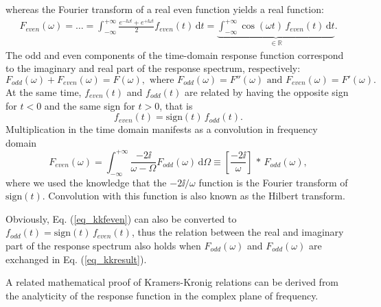 whereas the Fourier transform of a real even function yields a real function:
\begin{equation} 
\begin{split} 
F_{even}(\omega)= \ldots =   \int_{-\infty}^{+\infty} \frac{e^{-\ii \omega t}+e^{+\ii \omega t}}{2} f_{even}(t) \,\mbox{d}t 
		 = \underbrace{\int_{-\infty}^{+\infty} \cos(\omega t) \, f_{even}(t) \,\mbox{d}t}_{\mbox{$\in \mathbb{R}$}}.
\end{split} 
\label{eq_kkFeven}\end{equation}
The odd and even components of the time-domain response function correspond to the imaginary and real part of the response spectrum, respectively:
\begin{equation} F_{odd}(\omega) + F_{even}(\omega) = F(\omega), \text{ where } F_{odd}(\omega) = F''(\omega) \text{ and } F_{even}(\omega) = F'(\omega).  \label{eq_kkFodd}\end{equation}
At the same time, $f_{even}(t)$ and $f_{odd}(t)$ are related by having the opposite sign for $t<0$ and the same sign for $t>0$, that is 
\begin{equation} f_{even}(t) = \mbox{sign}(t)\,f_{odd}(t). \label{eq_kkfeven}\end{equation}
Multiplication in the time domain manifests as a convolution in frequency domain
\begin{equation} 
F_{even}(\omega) = \int_{-\infty}^{+\infty}  \frac{-2\ii}{\omega - \Omega} F_{odd}(\omega) \,\mbox{d}\Omega  \equiv  \left[\frac{-2\ii}{\omega}\right]\,\ast\,F_{odd}(\omega),
\label{eq_kkresult}\end{equation} 
where we used the knowledge that the $-2\ii/\omega$ function is the Fourier transform of $\mbox{sign}(t)$. Convolution with this function is also known as the Hilbert transform.%

Obviously, Eq. (\ref{eq_kkfeven}) can also be converted to $f_{odd}(t) = \mbox{sign}(t)\,f_{even}(t)$, thus the relation between the real and imaginary part of the response spectrum also holds when $F_{odd}(\omega)$ and $F_{odd}(\omega)$ are exchanged in Eq. (\ref{eq_kkresult}). 

A related mathematical proof of Kramers-Kronig relations can be derived from the analyticity of the response function in the complex plane of frequency. %


